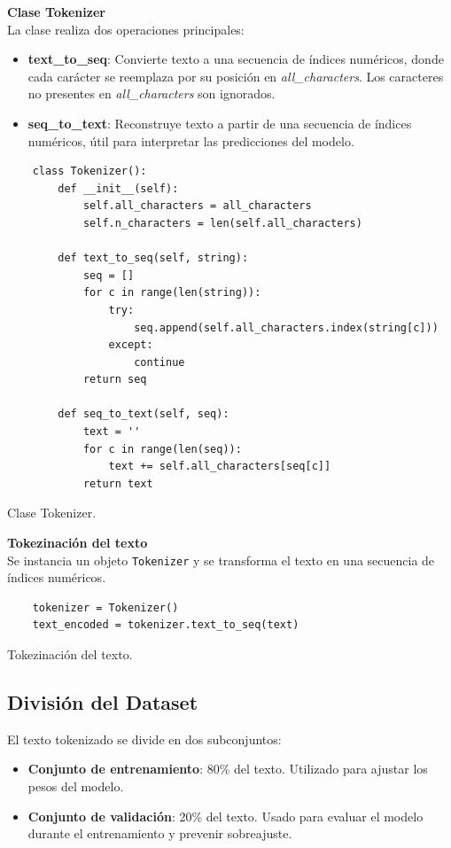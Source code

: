\documentclass{article}
\begin{document}
\textbf{\large{Clase Tokenizer}} \\
La clase realiza dos operaciones principales:
\begin{itemize}
    \item \textbf{text\_to\_seq}: Convierte texto a una secuencia de índices numéricos, donde cada carácter se reemplaza por su posición en \textit{all\_characters}. Los caracteres no presentes en \textit{all\_characters} son ignorados.
    \item \textbf{seq\_to\_text}: Reconstruye texto a partir de una secuencia de índices numéricos, útil para interpretar las predicciones del modelo.
\end{itemize}

\begin{listing}[H]
\begin{verbatim}
    class Tokenizer():
        def __init__(self):
            self.all_characters = all_characters
            self.n_characters = len(self.all_characters)

        def text_to_seq(self, string):
            seq = []
            for c in range(len(string)):
                try:
                    seq.append(self.all_characters.index(string[c]))
                except:
                    continue
            return seq

        def seq_to_text(self, seq):
            text = ''
            for c in range(len(seq)):
                text += self.all_characters[seq[c]]
            return text
\end{verbatim}
\caption{Clase Tokenizer.}
\end{listing}

\textbf{\large{Tokezinación del texto}} \\
Se instancia un objeto \texttt{Tokenizer} y se transforma el texto en una secuencia de índices numéricos.

\begin{listing}[H]
\begin{verbatim}
    tokenizer = Tokenizer()
    text_encoded = tokenizer.text_to_seq(text)
\end{verbatim}
\caption{Tokezinación del texto.}
\end{listing}

\newpage

\subsection{División del Dataset}
El texto tokenizado se divide en dos subconjuntos:
\begin{itemize}
    \item \textbf{Conjunto de entrenamiento}: 80\% del texto. Utilizado para ajustar los pesos del modelo.
    \item \textbf{Conjunto de validación}: 20\% del texto. Usado para evaluar el modelo durante el entrenamiento y prevenir sobreajuste.
\end{itemize}
\end{document}
